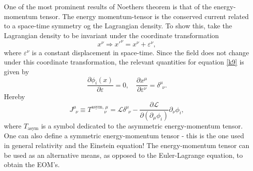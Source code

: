 \begin{example}
	One of the most prominent results of Noethers theorem is that of the energy-momentum tensor. The energy momentum-tensor is the conserved current related to a space-time symmetry og the Lagrangian density. To show this, take the Lagrangian density to be invariant under the coordinate transformation
	\begin{equation}
		x^\nu\Rightarrow {x'}^\nu=x^\nu+\varepsilon^\nu,
	\end{equation} 
	where $\varepsilon^\nu$ is a constant displacement in space-time. Since the field does not change under this coordinate transformation, the relevant quantities for equation \eqref{k9} is given by
	\begin{equation}
		\frac{\partial \phi_i(x)}{\partial \varepsilon}=0, \quad \frac{\partial x^\mu}{\partial \varepsilon^\nu}=\delta^\mu_{\,\,\, \nu}.
	\end{equation} 
	Hereby
	\begin{equation}
		J^\mu_{\,\,\,\nu}\equiv T^{\text{asym}, \, \mu}_{\,\,\,\,\,\,\,\,\,\,\,\,\,\,\,\,\nu}=\mathcal{L}\delta^\mu_{\,\,\,\nu}-\frac{\partial \mathcal{L}}{\partial (\partial_\mu\phi_i)}\partial_\nu\phi_i,
		\label{EM tensor}
	\end{equation} 
	where $T_{\text{asym}}$ is a symbol dedicated to the asymmetric energy-momentum tensor. One can also define a symmetric energy-momentum tensor - this is the one used in general relativity and the Einstein equation! The energy-momentum tensor can be used as an alternative means, as opposed to the Euler-Lagrange equation, to obtain the EOM's.
	
\end{example}

